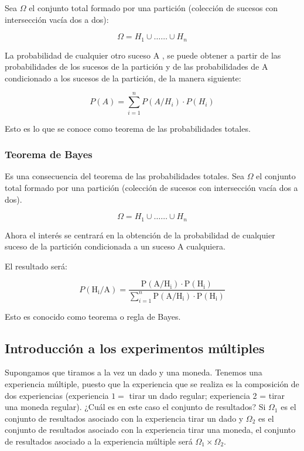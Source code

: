 \documentclass[
]{article}
\begin{document}
Sea \(\Omega\) el conjunto total formado por una partición (colección de
sucesos con intersección vacía dos a dos):

\[
\Omega=H_{1} \cup \ldots \ldots \cup H_{n}
\]

La probabilidad de cualquier otro suceso A , se puede obtener a partir
de las probabilidades de los sucesos de la partición y de las
probabilidades de A condicionado a los sucesos de la partición, de la
manera siguiente:

\[
P(A)=\sum_{i=1}^{n} P\left(A / H_{i}\right) \cdot P\left(H_{i}\right)
\]

Esto es lo que se conoce como teorema de las probabilidades totales.

\subsubsection{Teorema de Bayes}\label{teorema-de-bayes}

Es una consecuencia del teorema de las probabilidades totales. Sea
\(\Omega\) el conjunto total formado por una partición (colección de
sucesos con intersección vacía dos a dos).

\[
\Omega=H_{1} \cup \ldots \ldots \cup H_{n}
\]

Ahora el interés se centrará en la obtención de la probabilidad de
cualquier suceso de la partición condicionada a un suceso A cualquiera.

El resultado será:

\[
P\left(\mathrm{H}_{\mathrm{i}} / \mathrm{A}\right)=\frac{\mathrm{P}\left(\mathrm{A} / \mathrm{H}_{\mathrm{i}}\right) \cdot \mathrm{P}\left(\mathrm{H}_{\mathrm{i}}\right)}{\sum_{i=1}^{n} \mathrm{P}\left(\mathrm{A} / \mathrm{H}_{\mathrm{i}}\right) \cdot \mathrm{P}\left(\mathrm{H}_{\mathrm{i}}\right)}
\]

Esto es conocido como teorema o regla de Bayes.

\subsection{Introducción a los experimentos múltiples}\label{introducciuxf3n-a-los-experimentos-muxfaltiples}

Supongamos que tiramos a la vez un dado y una moneda. Tenemos una
experiencia múltiple, puesto que la experiencia que se realiza es la
composición de dos experiencias (experiencia \(1=\) tirar un dado regular;
experiencia 2 = tirar una moneda regular). ¿Cuál es en este caso el
conjunto de resultados? Si \(\Omega_{1}\) es el conjunto de resultados
asociado con la experiencia tirar un dado y \(\Omega_{2}\) es el conjunto
de resultados asociado con la experiencia tirar una moneda, el conjunto
de resultados asociado a la experiencia múltiple será
\(\Omega_{1} \times \Omega_{2}\).
\end{document}
